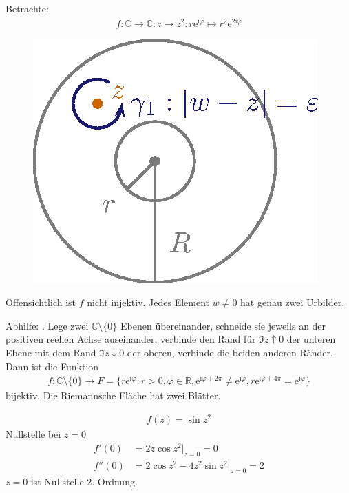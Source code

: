 \documentclass[a4paper,10pt]{scrbook}
\begin{document}
Betrachte:
%
\begin{align*}
  f : \mathbb{C} \to \mathbb{C} : z \mapsto z^2 : r \mathrm{e}^{\mathrm{i} \varphi} \mapsto r^2 \mathrm{e}^{2 \mathrm{i} \varphi}
\end{align*}

\begin{figure}[H]
  \centering
  \includegraphics[scale=0.2]{images/ana3-tmp-23}
\end{figure}

Offensichtlich ist $f$ nicht injektiv. Jedes Element $w \neq 0$ hat genau zwei Urbilder.

Abhilfe: . Lege zwei $\mathbb{C} \setminus \{ 0 \}$ Ebenen übereinander, schneide sie jeweils an der positiven reellen Achse auseinander, verbinde den Rand für $\Im z \uparrow 0$ der unteren Ebene mit dem Rand $\Im z \downarrow 0$ der oberen, verbinde die beiden anderen Ränder. Dann ist die Funktion
%
\begin{align*}
  f : \mathbb{C} \setminus \{0\} \to F = \{ r \mathrm{e}^{\mathrm{i} \varphi} : r > 0, \varphi \in \mathbb{R}, \mathrm{e}^{\mathrm{i} \varphi + 2 \pi} \neq \mathrm{e}^{\mathrm{i} \varphi}, r \mathrm{e}^{\mathrm{i} \varphi + 4 \pi} = \mathrm{e}^{\mathrm{i} \varphi} \}
\end{align*}
%
bijektiv. Die Riemannsche Fläche hat zwei Blätter.


\begin{example*}
  \begin{align*}
    f(z) = \sin z^2
  \end{align*}
  Nullstelle bei $z=0$
  \begin{align*}
    f'(0) &= 2 z \cos z^2 \Big|_{z=0} = 0 \\
    f''(0) &= 2 \cos z^2 - 4 z^2 \sin z^2 \Big|_{z=0} = 2
  \end{align*}
  $z=0$ ist Nullstelle 2. Ordnung.
\end{example*}
\end{document}
